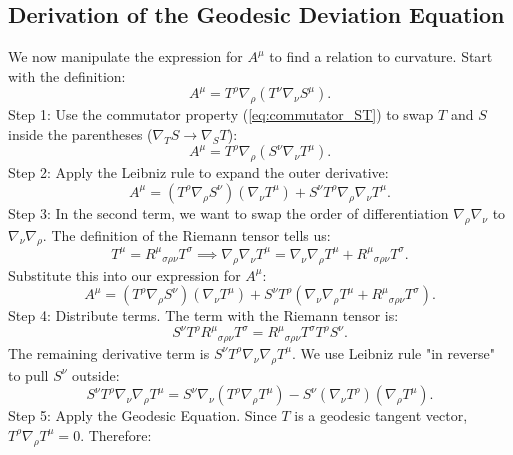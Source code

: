 \documentclass[11pt, a4paper]{report}
\begin{document}
\subsection*{Derivation of the Geodesic Deviation Equation}
We now manipulate the expression for \(A^\mu\) to find a relation to curvature.
Start with the definition:
\begin{equation}
A^\mu = T^\rho \nabla_\rho (T^\nu \nabla_\nu S^\mu).
\end{equation}
Step 1: Use the commutator property (\ref{eq:commutator_ST}) to swap \(T\) and \(S\) inside the parentheses (\(\nabla_T S \to \nabla_S T\)):
\begin{equation}
A^\mu = T^\rho \nabla_\rho (S^\nu \nabla_\nu T^\mu).
\end{equation}
Step 2: Apply the Leibniz rule to expand the outer derivative:
\begin{equation}
A^\mu = (T^\rho \nabla_\rho S^\nu)(\nabla_\nu T^\mu) + S^\nu T^\rho \nabla_\rho \nabla_\nu T^\mu.
\end{equation}
Step 3: In the second term, we want to swap the order of differentiation \(\nabla_\rho \nabla_\nu\) to \(\nabla_\nu \nabla_\rho\). The definition of the Riemann tensor tells us:
\begin{equation}
[\nabla_\rho, \nabla_\nu] T^\mu = {R^\mu}_{\sigma\rho\nu} T^\sigma \implies \nabla_\rho \nabla_\nu T^\mu = \nabla_\nu \nabla_\rho T^\mu + {R^\mu}_{\sigma\rho\nu} T^\sigma.
\end{equation}
Substitute this into our expression for \(A^\mu\):
\begin{equation}
A^\mu = (T^\rho \nabla_\rho S^\nu)(\nabla_\nu T^\mu) + S^\nu T^\rho \left( \nabla_\nu \nabla_\rho T^\mu + {R^\mu}_{\sigma\rho\nu} T^\sigma \right).
\end{equation}
Step 4: Distribute terms. The term with the Riemann tensor is:
\begin{equation}
S^\nu T^\rho {R^\mu}_{\sigma\rho\nu} T^\sigma = {R^\mu}_{\sigma\rho\nu} T^\sigma T^\rho S^\nu.
\end{equation}
The remaining derivative term is \(S^\nu T^\rho \nabla_\nu \nabla_\rho T^\mu\). We use Leibniz rule "in reverse" to pull \(S^\nu\) outside:
\begin{equation}
S^\nu T^\rho \nabla_\nu \nabla_\rho T^\mu = S^\nu \nabla_\nu (T^\rho \nabla_\rho T^\mu) - S^\nu (\nabla_\nu T^\rho) (\nabla_\rho T^\mu).
\end{equation}
Step 5: Apply the Geodesic Equation. Since \(T\) is a geodesic tangent vector, \(T^\rho \nabla_\rho T^\mu = 0\). Therefore:
\end{document}
